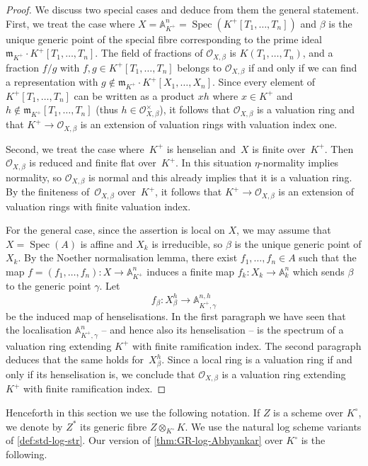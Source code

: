 \documentclass[a4paper,twoside,11pt,reqno]{amsart}
\renewcommand{\mathbb}{\mathds}
\newcommand{\bA}{{\mathbb A}}
\newcommand{\cO}{{\mathcal O}}
\newcommand{\la}{\longrightarrow}
\DeclareMathOperator{\Spec}{Spec}
\theoremstyle{definition}
\numberwithin{equation}{subsection}
\begin{document}
\begin{proof}
We discuss two special cases and deduce from them the general statement.
First, we treat the case where $X = \bA^n_{K^+} = \Spec (K^+[T_1,\ldots,T_n])$ and $\beta$ is the unique generic point of the special fibre corresponding to the prime ideal $\mathfrak{m}_{K^+}\cdot K^+[T_1,\ldots,T_n]$.
The field of fractions of $\cO_{X,\beta}$ is $K(T_1, \dots, T_n)$, and a fraction $f/g$ with $f,g\in K^+[T_1,\dots, T_n]$ belongs to $\cO_{X,\beta}$ if and only if we can find a representation with $g\notin \mathfrak{m}_{K^+} \cdot K^+[X_1, \ldots, X_n]$.
Since every element of $K^+[T_1,\ldots,T_n]$ can be written as a product $x h$ where $x\in K^+$ and $h\notin \mathfrak{m}_{K^+}[T_1,\ldots,T_n]$ (thus $h\in \cO_{X,\beta}^\times$), it follows that $\cO_{X,\beta}$ is a valuation ring and that  $K^+\to \cO_{X,\beta}$ is an extension of valuation rings with valuation index one. 

Second, we treat the case where~$K^+$ is henselian and~$X$ is finite over~$K^+$.
Then $\cO_{X,\beta}$ is reduced and finite flat over~$K^+$.
In this situation $\eta$-normality implies normality, so $\cO_{X,\beta}$ is normal and this already implies that it is a valuation ring.
By the finiteness of~$\cO_{X,\beta}$ over~$K^+$, it follows that $K^+\to \cO_{X,\beta}$ is an extension of valuation rings with finite valuation index.

For the general case, since the assertion is local on $X$, we may assume that $X = \Spec(A)$ is affine and $X_k$ is irreducible, so $\beta$ is the unique generic point of $X_k$.
By the Noether normalisation lemma, there exist $f_1,\dots, f_n\in A$ such that the map $f=(f_1,\dots, f_n)\colon X\to \bA^n_{K^+}$ induces a finite map $f_k\colon X_k\to \bA^n_k$ which sends $\beta$ to the generic point $\gamma$.
Let
\[
    f_\beta \colon X_\beta^h \la \bA_{K^+,\gamma}^{n,h}
\]
be the induced map of henselisations.
In the first paragraph we have seen that the localisation $\bA_{K^+,\gamma}^n$ -- and hence also its henselisation -- is the spectrum of a valuation ring extending $K^+$ with finite ramification index.
The second paragraph deduces that the same holds for~$X_\beta^h$.
Since a local ring is a valuation ring if and only if its henselisation is, we conclude that $\cO_{X,\beta}$ is a valuation ring extending $K^+$ with finite ramification index.
\end{proof}

Henceforth in this section we use the following notation. If $Z$ is a scheme over $K^\circ$, we denote by $Z^*$ its generic fibre $Z\otimes_{K^\circ} K$. We use the natural log scheme variants of \cref{def:std-log-str}.  Our version of \cref{thm:GR-log-Abhyankar} over $K^\circ$ is the following.    
\end{document}
